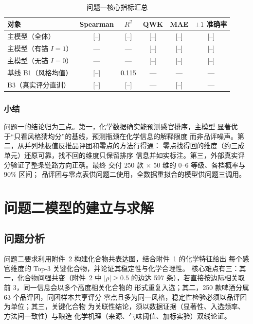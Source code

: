 \documentclass[12pt,a4paper]{article}
\begin{document}
\begin{table}[htbp]
  \centering\small
  \caption{问题一核心指标汇总}
  \label{tab:q1_summary}
  \begin{tabular}{lccccc}
    \toprule
    对象 & Spearman & $R^2$ & QWK & MAE & $\pm1$ 准确率 \\
    \midrule
    主模型（全体） & [--] & [--] & [--] & [--] & [--] \\
    主模型（有锚 $I{=}1$） & --- & --- & [--] & [--] & [--] \\
    主模型（无锚 $I{=}0$） & --- & --- & [--] & [--] & [--] \\
    基线 B1（风格均值） & [--] & 0.115 & --- & --- & --- \\
    B3（真实评分直训） & [--] & [--] & --- & [--] & --- \\
    \bottomrule
  \end{tabular}
\end{table}

\subsubsection{小结}

问题一的结论归为三点。第一，化学数据确实能预测感官排序，主模型
显著优于``只看风格猜均分''的基线，预测瓶颈在化学信息的解释限度
而非品评噪声。第二，从并列地板值反推品评团和零点的方法行得通：
零点找得回的维度（约三成单元）还原可靠，找不回的维度只保留排序
信息并如实标注。第三，外部真实评分验证了整条链路方向正确。最终
交付 250 款 $\times$ 50 维的 0--6 等级、各档概率与 90\% 区间；
品评团与零点表供问题二使用，全数据重拟合的模型供问题三调用。


\section{问题二模型的建立与求解}

\subsection{问题分析}

问题二要求利用附件~2 构建化合物共表达图，结合附件~1 的化学特征给出
每个感官维度的 Top-3 关键化合物，并论证其稳定性与化学合理性。
核心难点有三：其一，化合物间强共变（附件~2 中 $|\rho|\ge0.5$ 的边达
597 条），若直接按边际相关取前 3，同一信息会以多个高度相关化合物的
形式重复入选；其二，250 款啤酒分属 63 个品评团，同团样本共享评分
零点且多为同一风格，稳定性检验必须以品评团为单位；其三，关键化合物
为关联性结论，须以数据证据（显著性、入选频率、方法间一致性）与酿造
化学机理（来源、气味阈值、加标实验）双线论证。
\end{document}
